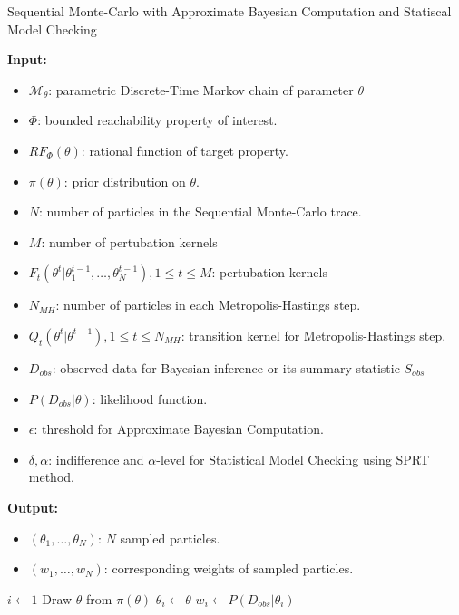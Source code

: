 \begin{algorithm}[H]
    \caption{Sequential Monte-Carlo with Approximate Bayesian Computation and Statiscal Model Checking}
    \label{smc-abc-smc-alg}
    \hspace*{\algorithmicindent} \textbf{Input:}
    \begin{itemize}
        \item $\mathcal{M}_\theta$: parametric Discrete-Time Markov chain of parameter $\theta$
        \item $\Phi$: bounded reachability property of interest.
        \item $RF_\Phi(\theta)$: rational function of target property.
        \item $\pi(\theta)$: prior distribution on $\theta$.
        \item $N$: number of particles in the Sequential Monte-Carlo trace.
        \item $M$: number of pertubation kernels
        \item $F_t(\theta^t | \theta^{t-1}_1,\ldots,\theta^{t-1}_N), 1\leq t \leq M$: pertubation kernels
        \item $N_{MH}$: number of particles in each Metropolis-Hastings step.
        \item $Q_t(\theta^t|\theta^{t-1}), 1 \leq t \leq N_{MH}$: transition kernel for Metropolis-Hastings step.
        \item $D_{obs}$: observed data for Bayesian inference or its summary statistic $S_{obs}$
        \item $P(D_{obs}|\theta)$: likelihood function.
        \item $\epsilon$: threshold for Approximate Bayesian Computation.
        \item $\delta, \alpha$: indifference and $\alpha$-level for Statistical Model Checking using SPRT method.
    \end{itemize}
    \hspace*{\algorithmicindent} \textbf{Output:}
    \begin{itemize}
        \item $(\theta_1,\ldots,\theta_N)$: $N$ sampled particles.
        \item $(w_1,\ldots,w_N)$: corresponding weights of sampled particles.
    \end{itemize}
    \begin{algorithmic}[1]
        \State $i \leftarrow 1$
         
            \State Draw $\theta$ from $\pi(\theta)$
            \State $\theta_i \leftarrow \theta$
            \State $w_i \leftarrow P(D_{obs}|\theta_i)$
        \EndWhile
\end{algorithmic}
\end{algorithm}

